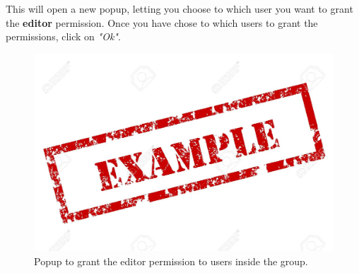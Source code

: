 This will open a new popup, letting you choose to which user you want to grant the \textbf{editor} permission. Once you have chose to which users to grant the permissions, click on \textit{"Ok"}.

\begin{figure}[H]
  \centering 
  \includegraphics[width=\textwidth]{Sections/3-HowToUse/Images/example.jpeg}
  \caption{Popup to grant the editor permission to users inside the group.}
\end{figure}
